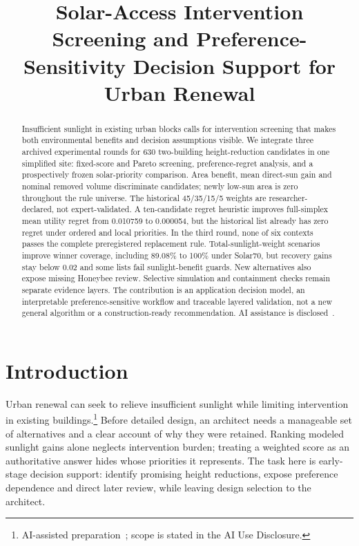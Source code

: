 \documentclass{llncs}
\newcommand{\aidraft}{\footnote{AI-assisted preparation~\cite{openai2026}; scope is stated in the AI Use Disclosure.}}
\begin{document}
\title{Solar-Access Intervention Screening and Preference-Sensitivity Decision Support for Urban Renewal}
\author{}\institute{}\maketitle{}
\begin{abstract}
Insufficient sunlight in existing urban blocks calls for intervention screening that makes both environmental benefits and decision assumptions visible. We integrate three archived experimental rounds for 630 two-building height-reduction candidates in one simplified site: fixed-score and Pareto screening, preference-regret analysis, and a prospectively frozen solar-priority comparison. Area benefit, mean direct-sun gain and nominal removed volume discriminate candidates; newly low-sun area is zero throughout the rule universe. The historical 45/35/15/5 weights are researcher-declared, not expert-validated. A ten-candidate regret heuristic improves full-simplex mean utility regret from 0.010759 to 0.000054, but the historical list already has zero regret under ordered and local priorities. In the third round, none of six contexts passes the complete preregistered replacement rule. Total-sunlight-weight scenarios improve winner coverage, including 89.08\% to 100\% under Solar70, but recovery gains stay below 0.02 and some lists fail sunlight-benefit guards. New alternatives also expose missing Honeybee review. Selective simulation and containment checks remain separate evidence layers. The contribution is an application decision model, an interpretable preference-sensitive workflow and traceable layered validation, not a new general algorithm or a construction-ready recommendation. AI assistance is disclosed~\cite{openai2026}.
\end{abstract}

\section{Introduction}
Urban renewal can seek to relieve insufficient sunlight while limiting intervention in existing buildings.\aidraft{} Before detailed design, an architect needs a manageable set of alternatives and a clear account of why they were retained. Ranking modeled sunlight gains alone neglects intervention burden; treating a weighted score as an authoritative answer hides whose priorities it represents. The task here is early-stage decision support: identify promising height reductions, expose preference dependence and direct later review, while leaving design selection to the architect.
\end{document}
